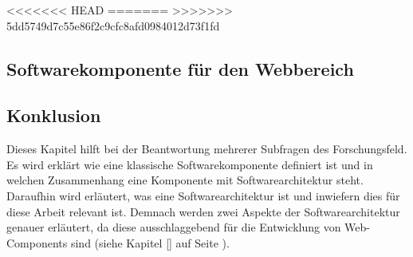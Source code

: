 <<<<<<< HEAD
=======
>>>>>>> 5dd5749d7c55e86f2c9cfc8afd0984012d73f1fd

\subsection{Softwarekomponente für den Webbereich}

\label{sec:2_Softwarekomponente_Web}

\subsection{Konklusion}
\label{sec:2_Konklusion}
Dieses Kapitel hilft bei der Beantwortung mehrerer Subfragen des Forschungsfeld. Es wird erklärt wie eine klassische Softwarekomponente definiert ist und in welchen Zusammenhang eine Komponente mit Softwarearchitektur steht. Daraufhin wird erläutert, was eine Softwarearchitektur ist und inwiefern dies für diese Arbeit relevant ist. Demnach werden zwei Aspekte der Softwarearchitektur genauer erläutert, da diese ausschlaggebend für die Entwicklung von Web-Components sind (siehe Kapitel \ref{} auf Seite \pageref{} ).


